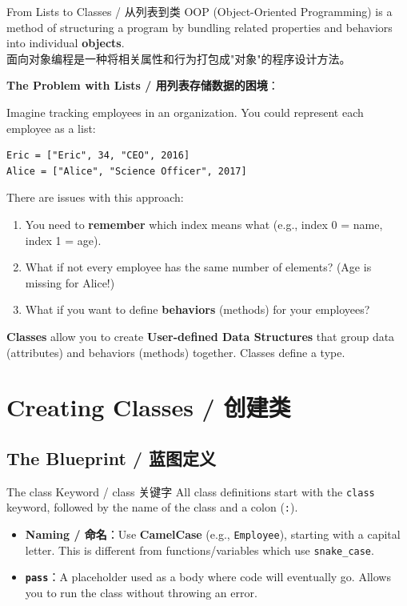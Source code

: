 \documentclass[11pt,a4paper]{report}
\let\oldtexttt\texttt
\renewcommand{\texttt}[1]{\textcolor{mainblue}{\oldtexttt{#1}}}
\begin{document}
\begin{concept}{From Lists to Classes / 从列表到类}
    OOP (Object-Oriented Programming) is a method of structuring a program by bundling related properties and behaviors into individual \textbf{objects}. \\
    面向对象编程是一种将相关属性和行为打包成"对象"的程序设计方法。

    \textbf{The Problem with Lists / 用列表存储数据的困境}：

    Imagine tracking employees in an organization. You could represent each employee as a list:
\begin{lstlisting}
Eric = ["Eric", 34, "CEO", 2016]
Alice = ["Alice", "Science Officer", 2017]
\end{lstlisting}
    There are issues with this approach:
    \begin{enumerate}[itemsep=0.3em]
        \item You need to \textbf{remember} which index means what (e.g., index 0 = name, index 1 = age).
        \item What if not every employee has the same number of elements? (Age is missing for Alice!)
        \item What if you want to define \textbf{behaviors} (methods) for your employees?
    \end{enumerate}

    \textbf{Classes} allow you to create \textbf{User-defined Data Structures} that group data (attributes) and behaviors (methods) together. Classes define a type.
\end{concept}

\section{Creating Classes / 创建类}

\subsection{The Blueprint / 蓝图定义}

\begin{concept}{The class Keyword / class 关键字}
    All class definitions start with the \texttt{class} keyword, followed by the name of the class and a colon (\texttt{:}).
    \begin{itemize}[itemsep=0.3em]
        \item \textbf{Naming / 命名}：Use \textbf{CamelCase} (e.g., \texttt{Employee}), starting with a capital letter. This is different from functions/variables which use \texttt{snake\_case}.
        \item \textbf{\texttt{pass}}：A placeholder used as a body where code will eventually go. Allows you to run the class without throwing an error.
    \end{itemize}
\end{concept}
\end{document}
